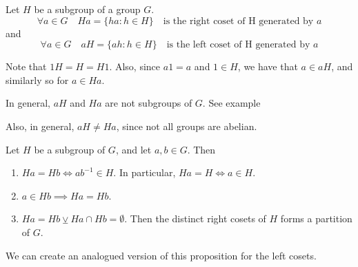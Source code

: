\documentclass[notoc,notitlepage]{tufte-book}
\begin{document}
\begin{defn}[Coset]
\label{defn:coset}
  Let $H$ be a subgroup of a group $G$.
  \begin{equation*}
    \forall a \in G \quad Ha = \{ha : h \in H\} \quad \text{is the right coset of H generated by } a
  \end{equation*}
  and
  \begin{equation*}
    \forall a \in G \quad aH = \{ah : h \in H\} \quad \text{is the left coset of H generated by } a
  \end{equation*}
\end{defn}

\begin{note}
  Note that $1H = H = H1$. Also, since $a1 = a$ and $1 \in H$, we have that $a \in aH$, and similarly so for $a \in Ha$.

  In general, $aH$ and $Ha$ are not subgroups of $G$. See example

  Also, in general, $aH \neq Ha$, since not all groups are abelian.
\end{note}

\begin{propo}
\label{propo:properties_of_cosets}
  Let $H$ be a subgroup of $G$, and let $a, b \in G$. Then
  \begin{enumerate}
    \item $Ha = Hb \iff ab^{-1} \in H$. In particular, $Ha = H \iff a \in H$.
    \item $a \in Hb \implies Ha = Hb$.
    \item $Ha = Hb \veebar Ha \cap Hb = \emptyset$. Then the distinct right cosets of $H$ forms a partition of $G$.
  \end{enumerate}
  We can create an analogued version of this proposition for the left cosets.
\end{propo}
\end{document}
